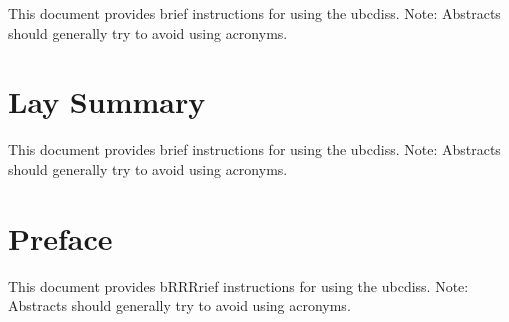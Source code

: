 This document provides brief instructions for using the ubcdiss.
Note: Abstracts should generally try to avoid using acronyms.

\chapter{Lay Summary}

This document provides brief instructions for using the ubcdiss.
Note: Abstracts should generally try to avoid using acronyms.

\chapter{Preface}

This document provides bRRRrief instructions for using the ubcdiss.
Note: Abstracts should generally try to avoid using acronyms.

